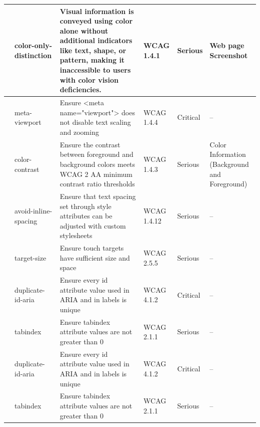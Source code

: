 \documentclass[sigconf, nonacm]{acmart}
\begin{document}
\begin{table}
{\begin{tabular}{|p{1.8cm}|p{2cm}|p{7cm}|p{1.5cm}|p{1.5cm}|p{2.7cm}|}
       & color-only-distinction            & Visual information is conveyed using color alone without additional indicators like text, shape, or pattern, making it inaccessible to users with color vision deficiencies. & WCAG 1.4.1             &  Serious    & Web page Screenshot   \\ \hline



&meta-viewport      & Ensure <meta name="viewport"> does not disable text scaling and zooming            &    WCAG 1.4.4         &  Critical & -- \\ 

&color-contrast      &    Ensure the contrast between foreground and background colors meets WCAG 2 AA minimum contrast ratio thresholds         &       WCAG 1.4.3     &  Serious & Color Information (Background and Foreground)\\ 

&avoid-inline-spacing      &    Ensure that text spacing set through style attributes can be adjusted with custom stylesheets         &     WCAG 1.4.12        &  Serious & --\\ 
&target-size      &     Ensure touch targets have sufficient size and space        &        WCAG 2.5.5     & Serious  & --\\ \hline





& duplicate-id-aria      &       Ensure every id attribute value used in ARIA and in labels is unique      &    WCAG 4.1.2      &  Critical   &  -- \\ 

& tabindex      &       Ensure tabindex attribute values are not greater than 0      &         WCAG 2.1.1     &  Serious  &  -- \\ 

& duplicate-id-aria      &       Ensure every id attribute value used in ARIA and in labels is unique      &       WCAG 4.1.2      &  Critical   &  -- \\ 

& tabindex      &       Ensure tabindex attribute values are not greater than 0      &          WCAG 2.1.1     &  Serious  &  -- \\ 


\end{tabular}}
\end{table}
\end{document}
